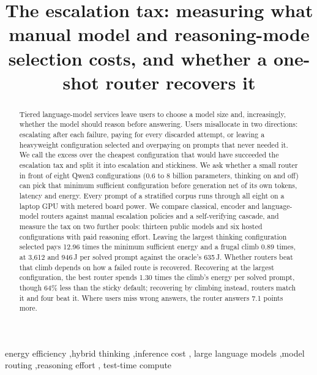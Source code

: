 \documentclass[final,5p,times,twocolumn]{elsarticle}
\begin{document}
\begin{frontmatter}

\title{The escalation tax: measuring what manual model and reasoning-mode
selection costs, and whether a one-shot router recovers it}

\begin{abstract}
Tiered language-model services leave users to choose a model size and,
increasingly, whether the model should reason before answering. Users
misallocate in two directions: escalating after each failure, paying for
every discarded attempt, or leaving a heavyweight configuration selected and
overpaying on prompts that never needed it. We call the excess over the
cheapest configuration that would have succeeded the escalation tax and
split it into escalation and stickiness. We ask whether a small router in
front of eight Qwen3 configurations (0.6 to 8 billion parameters, thinking
on and off) can pick that minimum sufficient configuration before generation
net of its own tokens, latency and energy. Every prompt of a
stratified corpus runs through all eight on a laptop GPU with metered board
power. We compare classical, encoder and language-model routers against
manual escalation policies and a self-verifying cascade, and measure the tax
on two further pools: thirteen public models and six hosted configurations
with paid reasoning effort. Leaving the largest thinking configuration
selected pays 12.96 times the minimum sufficient energy and a frugal climb
0.89 times, at 3{,}612 and 946\,J per solved prompt against the oracle's
635\,J. Whether routers beat that climb depends on how a failed route is
recovered. Recovering at the largest configuration, the best router spends
1.30 times the climb's energy per solved prompt, though 64\% less than the
sticky default; recovering by climbing instead, routers match it and four
beat it. Where users miss wrong answers, the router answers 7.1 points more.
\end{abstract}

\begin{keyword}
energy efficiency \sep hybrid thinking \sep inference cost \sep
large language models \sep model routing \sep reasoning effort \sep
test-time compute
\end{keyword}

\end{frontmatter}










{\footnotesize
\setlength{\bibsep}{0pt plus 0.3ex}

}
\end{document}
